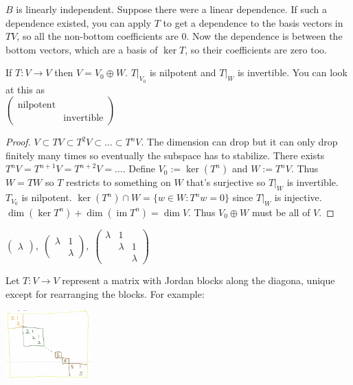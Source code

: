 \documentclass{article}
\newcommand{\ra}[1][]{\xrightarrow{#1}}
\DeclareMathOperator{\im}{im}
\begin{document}
\begin{proposition}
$B$ is linearly independent. Suppose there were a linear dependence. If such a dependence existed, you can apply $T$ to get a dependence to the basis vectors in $TV$, so all the non-bottom coefficients are 0. Now the dependence is between the bottom vectors, which are a basis of $\ker T$, so their coefficients are zero too. 
\end{proposition}
\begin{lemma}
If $T:V\ra V$ then $V=V_0\oplus W$. $T|_{V_0}$ is nilpotent and $T|_W$ is invertible. You can look at this as\\ $\begin{pmatrix}
\textrm{nilpotent}&\\
&\textrm{invertible}
\end{pmatrix}$
\end{lemma}
\begin{proof}
$V\subset TV\subset T^2V\subset...\subset T^nV$. The dimension can drop but it can only drop finitely many times so eventually the subspace has to stabilize. There exists $T^nV=T^{n+1}V=T^{n+2}V=...$. Define $V_0:=\ker(T^n)$ and $W:=T^n V$. Thus $W=TW$ so $T$ restricts to something on $W$ that's surjective so $T|_W$ is invertible. $T_{V_0}$ is nilpotent. $\ker(T^n)\cap W=\{w\in W:T^nw=0\}$ since $T|_W$ is injective. $\dim(\ker T^n)+\dim(\im T^n)=\dim V$. Thus $V_0\oplus W$ must be all of $V$. 
\end{proof}
\begin{definition}
$\begin{pmatrix}\lambda\end{pmatrix},\;\begin{pmatrix}\lambda&1\\&\lambda\end{pmatrix},\;\begin{pmatrix}\lambda&1&\\&\lambda&1\\&&\lambda\end{pmatrix}$
\end{definition}
\begin{theorem}
Let $T:V\ra V$ represent a matrix with Jordan blocks along the diagona, unique except for rearranging the blocks. For example:
\begin{center}
   \includegraphics[width=0.25\textwidth]{Image 3 9232020.PNG}
\end{center}
\end{theorem}
\end{document}
